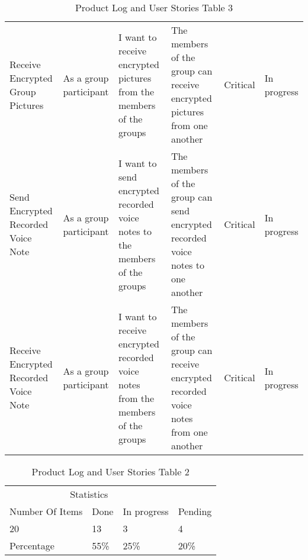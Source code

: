 \documentclass[a4paper]{article}
\begin{document}
\begin{table}
\begin{tabular}{p{2cm} p{2.5cm} p{3cm} p{3cm} p{1cm} p{0.75cm}}
Receive Encrypted Group Pictures & As a group participant & I want to receive encrypted pictures from the members of the groups & The members of the group can receive encrypted pictures from one another & Critical & In progress\\ \cmidrule(l){2-6} %

Send Encrypted Recorded Voice Note & As a group participant & I want to send encrypted recorded voice notes to the members of the groups & The members of the group can send encrypted recorded voice notes to one another & Critical & In progress\\ \cmidrule(l){2-6} %

Receive Encrypted Recorded Voice Note  & As a group participant & I want to receive encrypted recorded voice notes from the members of the groups & The members of the group can receive encrypted recorded voice notes from one another & Critical & In progress\\ %
\midrule %
\midrule %
\end{tabular}
\caption{Product Log and User Stories Table 3} %
\label{tab:template} %
\end{table}


\begin{table} 
\begin{tabular}{p{3cm} p{1.5cm} p{2cm} p{1.5cm}} %
\hline %
\multicolumn{3}{c}{Statistics} \\ %
\cmidrule(l){2-4} %
Number Of Items & Done & In progress & Pending \\  \cmidrule(l){2-4}%

20 & 13 & 3 & 4 \\ %
\midrule %
\midrule %
Percentage & 55\% & 25\% & 20\%\\ %
\bottomrule %
\end{tabular}
\caption{Product Log and User Stories Table 2} %
\label{tab:template} %
\end{table}
\end{document}
